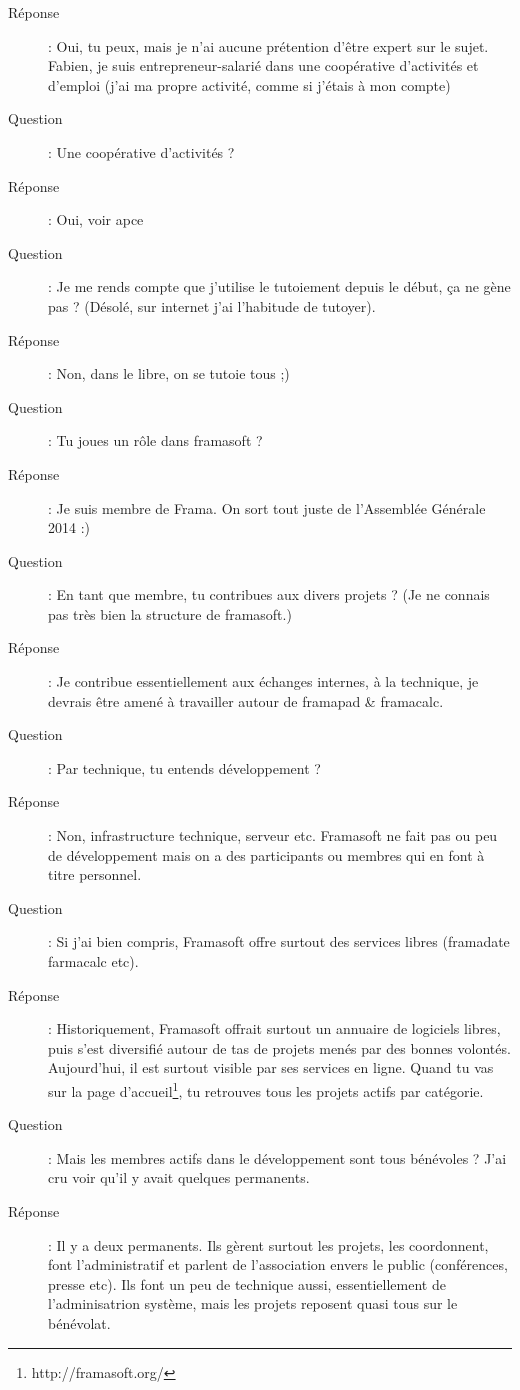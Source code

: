 \documentclass[a4paper,12pt, draft]{report}
\begin{document}
\begin{description}
\item [Réponse]:  Oui, tu peux, mais je n'ai aucune prétention d'être expert sur le sujet.  Fabien, je suis entrepreneur-salarié dans une coopérative d'activités et d'emploi (j'ai ma propre activité, comme si j'étais à mon compte)
\item [Question]:  Une coopérative d'activités ?
\item [Réponse]:  Oui, voir apce\cite{apce}
\item [Question]:  Je me rends compte que j'utilise le tutoiement depuis le début, ça ne gène pas ? (Désolé, sur internet j'ai l'habitude de tutoyer).
\item [Réponse]:  Non, dans le libre, on se tutoie tous ;)
\item [Question]:  Tu joues un rôle dans framasoft ?
\item [Réponse]:  Je suis membre de Frama. On sort tout juste de l'Assemblée Générale 2014 :)
\item [Question]:  En tant que membre, tu contribues aux divers projets ? (Je ne connais pas très bien la structure de framasoft.)
\item [Réponse]:  Je contribue essentiellement aux échanges internes, à la technique, je devrais être amené à travailler autour de framapad & framacalc.
\item [Question]:  Par technique, tu entends développement ?
\item [Réponse]:  Non, infrastructure technique, serveur etc. Framasoft ne fait pas ou peu de développement mais on a des participants ou membres qui en font à titre personnel.
\item [Question]:  Si j'ai bien compris, Framasoft offre surtout des services libres (framadate farmacalc etc).
\item [Réponse]:  Historiquement, Framasoft offrait surtout un annuaire de logiciels libres, puis s'est diversifié autour de tas de projets menés par des bonnes volontés. Aujourd'hui, il est surtout visible par ses services en ligne. Quand tu vas sur la page d'accueil\footnote{http://framasoft.org/}, tu retrouves tous les projets actifs par catégorie.
\item [Question]:  Mais les membres actifs dans le développement sont tous bénévoles ? J'ai cru voir qu'il y avait quelques permanents.
\item [Réponse]:  Il y a deux permanents. Ils gèrent surtout les projets, les coordonnent, font l'administratif et parlent de l'association envers le public (conférences, presse etc). Ils font un peu de technique aussi, essentiellement de l'adminisatrion système, mais les projets reposent quasi tous sur le bénévolat.

\end{description}
\end{document}
